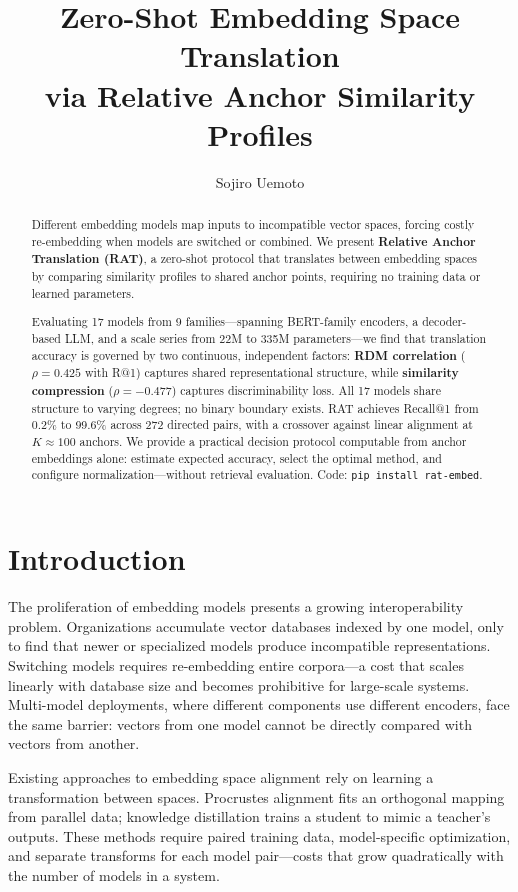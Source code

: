 \documentclass{article}
\title{Zero-Shot Embedding Space Translation\\via Relative Anchor Similarity Profiles}
\author{%
  Sojiro Uemoto
}
\begin{document}
\maketitle

\begin{abstract}
Different embedding models map inputs to incompatible vector spaces, forcing costly re-embedding when models are switched or combined. We present \textbf{Relative Anchor Translation (RAT)}, a zero-shot protocol that translates between embedding spaces by comparing similarity profiles to shared anchor points, requiring no training data or learned parameters.

Evaluating 17 models from 9 families---spanning BERT-family encoders, a decoder-based LLM, and a scale series from 22M to 335M parameters---we find that translation accuracy is governed by two continuous, independent factors: \textbf{RDM correlation} ($\rho = 0.425$ with R@1) captures shared representational structure, while \textbf{similarity compression} ($\rho = -0.477$) captures discriminability loss. All 17 models share structure to varying degrees; no binary boundary exists. RAT achieves Recall@1 from 0.2\% to 99.6\% across 272 directed pairs, with a crossover against linear alignment at $K \approx 100$ anchors. We provide a practical decision protocol computable from anchor embeddings alone: estimate expected accuracy, select the optimal method, and configure normalization---without retrieval evaluation. Code: \texttt{pip install rat-embed}.
\end{abstract}

\section{Introduction}
\label{sec:intro}

The proliferation of embedding models presents a growing interoperability problem. Organizations accumulate vector databases indexed by one model, only to find that newer or specialized models produce incompatible representations. Switching models requires re-embedding entire corpora---a cost that scales linearly with database size and becomes prohibitive for large-scale systems. Multi-model deployments, where different components use different encoders, face the same barrier: vectors from one model cannot be directly compared with vectors from another.

Existing approaches to embedding space alignment rely on learning a transformation between spaces. Procrustes alignment \citep{conneau2018word} fits an orthogonal mapping from parallel data; knowledge distillation \citep{hinton2015distilling} trains a student to mimic a teacher's outputs. These methods require paired training data, model-specific optimization, and separate transforms for each model pair---costs that grow quadratically with the number of models in a system.
\end{document}
